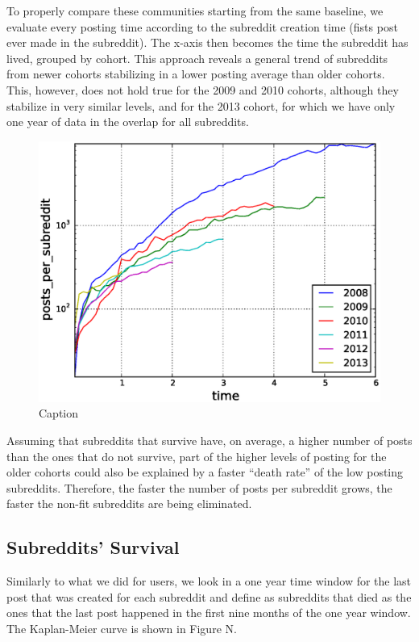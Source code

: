 To properly compare these communities starting from the same baseline, we evaluate every posting time according to the subreddit creation time (fists post ever made in the subreddit). The x-axis then becomes the time the subreddit has lived, grouped by cohort. This approach reveals a general trend of subreddits from newer cohorts stabilizing in a lower posting average than older cohorts. This, however, does not hold true for the 2009 and 2010 cohorts, although they stabilize in very similar levels, and for the 2013 cohort, for which we have only one year of data in the overlap for all subreddits.

\begin{figure}[!tb]
\centering
\includegraphics[scale=0.4]{./images/posts_per_subreddit_cohorts.eps}
\caption{Caption}
\label{fig:posts_per_subreddit_cohorts}
\end{figure}

Assuming that subreddits that survive have, on average, a higher number of posts than the ones that do not survive, part of the higher levels of posting for the older cohorts could also be explained by a faster ``death rate'' of the low posting subreddits. Therefore, the faster the number of posts per subreddit grows, the faster the non-fit subreddits are being eliminated.

\subsection{Subreddits' Survival}

Similarly to what we did for users, we look in a one year time window for the last post that was created for each subreddit and define as subreddits that died as the ones that the last post happened in the first nine months of the one year window. The Kaplan-Meier curve is shown in Figure N.

